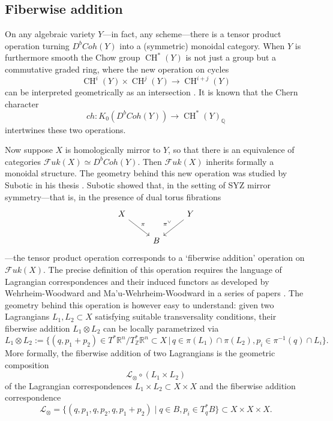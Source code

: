 \documentclass[10pt]{amsart}
\theoremstyle{definition}
\theoremstyle{remark}
\def\Q{\mathbb{Q}}
\def\R{\mathbb{R}}
\def\Z{\mathbb{Z}}
\DeclareMathOperator{\CH}{CH}
\def\inv{^{-1}}
\newcommand{\mcal}{\mathcal}
\newcommand{\st}{\,\vert\,}
\def\x{\times}
\begin{document}
 \subsection{Fiberwise addition}\label{sec:fiberwiseaddition}

On any algebraic variety $Y$---in fact, any scheme---there is a tensor product operation turning $D^bCoh(Y)$ into a (symmetric) monoidal category. 
When $Y$ is furthermore smooth the Chow group $\CH^*(Y)$ is not just a group but a commutative graded ring, where the new operation on cycles 
$$
    \CH^i(Y) \x \CH^j(Y) \to \CH^{i+j}(Y)
$$
can be interpreted geometrically as an intersection \cite{fulton2013intersection}.
It is known that the Chern character  
$$
ch:K_0(D^bCoh(Y)) \to \CH^*(Y)_\Q
$$
intertwines these two operations.

Now suppose $X$ is homologically mirror to $Y$, so that there is an equivalence of categories $\mcal Fuk(X) \simeq D^bCoh(Y)$.
Then $\mcal Fuk(X)$ inherits formally a monoidal structure.
The geometry behind this new operation was studied by Subotic in his thesis \cite{subotic}.
Subotic showed that, in the setting of SYZ mirror symmetry---that is, in the presence of dual torus fibrations
$$
\begin{tikzcd}
    X \arrow[dr,"\pi"]& & Y \arrow[dl,"\pi^\vee"']\\
    & B
\end{tikzcd}
$$
---the tensor product operation corresponds to a `fiberwise addition' operation on $\mcal Fuk(X)$.
The precise definition of this operation requires the language of Lagrangian correspondences and their induced functors as developed by Wehrheim-Woodward and Ma'u-Wehrheim-Woodward in a series of papers \cite{wehrheim2009pseudoholomorphic, wehrheim2010functoriality,ma2018a_}.
The geometry behind this operation is however easy to understand: given two Lagrangians $L_1,L_2 \subset X$ satisfying suitable transversality conditions, their fiberwise addition $L_1\otimes L_2$ can be locally parametrized via
$$
L_1 \otimes L_2 := 
\{
    (q, p_1+ p_2) \in T^*\R^n / T^*_\Z \R^n \subset X \st q \in \pi(L_1) \cap \pi(L_2), p_i \in \pi\inv(q) \cap L_i
\}.
$$
More formally, the fiberwise addition of two Lagrangians is the geometric composition 
$$
    \mcal L_{\otimes} \circ (L_1 \x L_2)
$$
of the Lagrangian correspondences $L_1 \x L_2 \subset X \x X$ and the fiberwise addition correspondence \cite{subotic}
\begin{equation}\label{eq:fiberwiseaddition}
\mcal L_{\otimes} = \{(q, p_1, q, p_2, q, p_1+p_2) \mid q \in B, p_i \in T^*_q B\} \subset X \x X \x X.
\end{equation}
\end{document}
